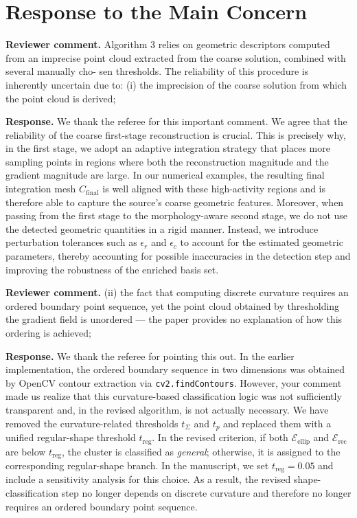 \documentclass[11pt]{article}
\newcommand{\reviewer}[1]{\vspace{0.4em}\noindent\textbf{Reviewer comment.} #1}
\newcommand{\response}[1]{\vspace{0.2em}\noindent\textbf{Response.} #1}
\begin{document}
\section*{Response to the Main Concern}

\reviewer{Algorithm 3 relies on geometric descriptors computed from an imprecise point
cloud extracted from the coarse solution, combined with several manually cho-
sen thresholds. The reliability of this procedure is inherently uncertain due
to: (i) the imprecision of the coarse solution from which the point cloud is
derived; }

\response{We thank the referee for this important comment. We agree that the reliability of the coarse first-stage reconstruction is crucial.
 This is precisely why, in the first stage, we adopt an adaptive integration strategy that places more sampling points in regions where both the reconstruction magnitude and the gradient magnitude are large. 
 In our numerical examples, the resulting final integration mesh $C_{\text{final}}$ is well aligned with these high-activity regions and is therefore able to capture the source's coarse geometric features. 
 Moreover, when passing from the first stage to the morphology-aware second stage, we do not use the detected geometric quantities in a rigid manner.
  Instead, we introduce perturbation tolerances such as $\epsilon_r$ and $\epsilon_c$ to account for the estimated geometric parameters, thereby accounting for possible inaccuracies in the detection step and improving the robustness of the enriched basis set.}

\reviewer{(ii) the fact that computing discrete curvature requires an ordered
boundary point sequence, yet the point cloud obtained by thresholding the
gradient field is unordered — the paper provides no explanation of how this
ordering is achieved;}

\response{We thank the referee for pointing this out. 
In the earlier implementation, the ordered boundary sequence in two dimensions was obtained by OpenCV contour extraction via \texttt{cv2.findContours}. However, your comment made us realize that this curvature-based classification logic was not sufficiently transparent and, in the revised algorithm, is not actually necessary. 
We have removed the curvature-related thresholds $t_{\Sigma}$ and $t_p$ and replaced them with a unified regular-shape threshold $t_{\text{reg}}$.
 In the revised criterion, if both $\mathcal{E}_{\text{ellip}}$ and $\mathcal{E}_{\text{rec}}$ are below $t_{\text{reg}}$, the cluster is classified as \emph{general};
  otherwise, it is assigned to the corresponding regular-shape branch. In the manuscript, we set $t_{\text{reg}}=0.05$ and include a sensitivity analysis for this choice. As a result, the revised shape-classification step no longer depends on discrete curvature and therefore no longer requires an ordered boundary point sequence.}
\end{document}
